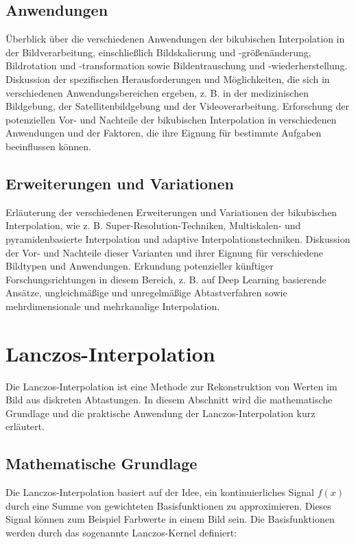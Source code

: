     \subsection{Anwendungen}

    Überblick über die verschiedenen Anwendungen der bikubischen Interpolation in der Bildverarbeitung, einschließlich Bildskalierung und -größenänderung, Bildrotation und -transformation sowie Bildentrauschung und -wiederherstellung.
    Diskussion der spezifischen Herausforderungen und Möglichkeiten, die sich in verschiedenen Anwendungsbereichen ergeben, z. B. in der medizinischen Bildgebung, der Satellitenbildgebung und der Videoverarbeitung.
    Erforschung der potenziellen Vor- und Nachteile der bikubischen Interpolation in verschiedenen Anwendungen und der Faktoren, die ihre Eignung für bestimmte Aufgaben beeinflussen können.

    \subsection{Erweiterungen und Variationen}

    Erläuterung der verschiedenen Erweiterungen und Variationen der bikubischen Interpolation, wie z. B. Super-Resolution-Techniken, Multiskalen- und pyramidenbasierte Interpolation und adaptive Interpolationstechniken.
    Diskussion der Vor- und Nachteile dieser Varianten und ihrer Eignung für verschiedene Bildtypen und Anwendungen.
    Erkundung potenzieller künftiger Forschungsrichtungen in diesem Bereich, z. B. auf Deep Learning basierende Ansätze, ungleichmäßige und unregelmäßige Abtastverfahren sowie mehrdimensionale und mehrkanalige Interpolation.


\section{Lanczos-Interpolation}
Die Lanczos-Interpolation ist eine Methode zur Rekonstruktion von Werten im Bild aus diskreten Abtastungen. 
In diesem Abschnitt wird die mathematische Grundlage und die praktische Anwendung der Lanczos-Interpolation kurz erläutert.

\subsection{Mathematische Grundlage}

Die Lanczos-Interpolation basiert auf der Idee, ein kontinuierliches Signal $f(x)$ durch eine Summe von gewichteten Basisfunktionen zu approximieren. 
Dieses Signal können zum Beispiel Farbwerte in einem Bild sein.
Die Basisfunktionen werden durch das sogenannte Lanczos-Kernel definiert:

